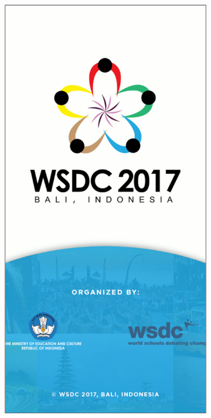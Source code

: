 \begin{figure}[H]
     \centering
     \begin{subfigure}[b]{0.3\textwidth}
         \centering
         \includegraphics[width=\textwidth]{Gambar/SSSplashScreen.png}

\end{subfigure}
\end{figure}
